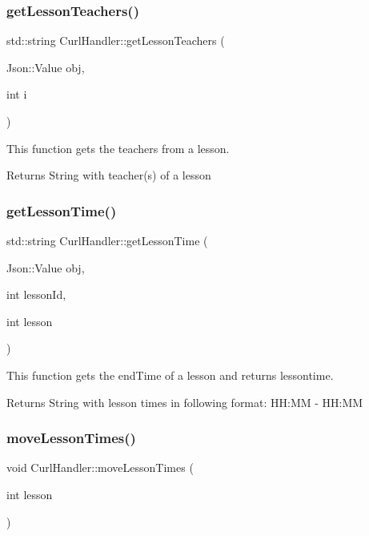 \subsubsection{\texorpdfstring{get\+Lesson\+Teachers()}{getLessonTeachers()}}
{\footnotesize\ttfamily std\+::string Curl\+Handler\+::get\+Lesson\+Teachers (\begin{DoxyParamCaption}\item[{Json\+::\+Value}]{obj,  }\item[{int}]{i }\end{DoxyParamCaption})}



This function gets the teachers from a lesson. 

\begin{DoxyReturn}{Returns}
String with teacher(s) of a lesson 
\end{DoxyReturn}
\mbox{\label{classCurlHandler_aa62b036298bc0ca7365cb32919996a54}} 
\subsubsection{\texorpdfstring{get\+Lesson\+Time()}{getLessonTime()}}
{\footnotesize\ttfamily std\+::string Curl\+Handler\+::get\+Lesson\+Time (\begin{DoxyParamCaption}\item[{Json\+::\+Value}]{obj,  }\item[{int}]{lesson\+Id,  }\item[{int}]{lesson }\end{DoxyParamCaption})}



This function gets the end\+Time of a lesson and returns lessontime. 

\begin{DoxyReturn}{Returns}
String with lesson times in following format\+: HH\+:MM -\/ HH\+:MM 
\end{DoxyReturn}
\mbox{\label{classCurlHandler_af6808f78b075e81747be9ff5c19a8b61}} 
\subsubsection{\texorpdfstring{move\+Lesson\+Times()}{moveLessonTimes()}}
{\footnotesize\ttfamily void Curl\+Handler\+::move\+Lesson\+Times (\begin{DoxyParamCaption}\item[{int}]{lesson }\end{DoxyParamCaption})}



